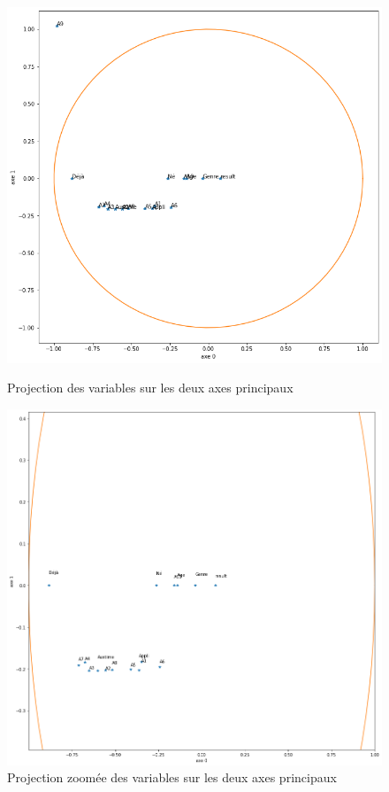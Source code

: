 \documentclass[12,french]{report}
\begin{document}
\begin{figure}[H]
    \begin{minipage}[c]{.46\linewidth}
        \centering
        \includegraphics[width=1\textwidth]{./Images/17}
        \caption{Projection des variables sur les deux axes principaux}
    \end{minipage}
    \hfill%
    \begin{minipage}[c]{.46\linewidth}
        \centering
        \includegraphics[width=1\textwidth]{./Images/18}
        \caption{Projection zoomée des variables sur les deux axes principaux}
    \end{minipage}
\end{figure}\vspace{0.1cm}
\end{document}
